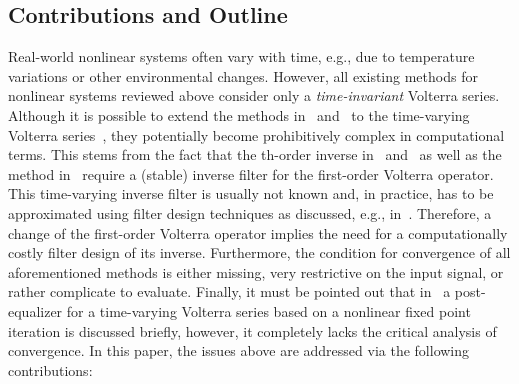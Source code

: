 \documentclass[10pt,twocolumn,twoside]{IEEEtran}
\begin{document}
\subsection{Contributions and Outline}
	\label{intro:contrib}

Real-world nonlinear systems often vary with time, e.g., due to
temperature variations or other environmental changes.
However, all existing methods for nonlinear systems reviewed
above consider only a \emph{time-invariant} Volterra series. Although
it is possible to extend the methods in~\cite{schetzen1976,sarti1992} and~\cite{nowak1997} to
the time-varying Volterra series~\cite{soudan2011}, they potentially become prohibitively complex
in computational terms. This stems from the fact that the th-order inverse in~\cite{schetzen1976}
and~\cite{sarti1992} as well as the method in~\cite{nowak1997} require a (stable) inverse filter
for the first-order Volterra operator. This time-varying inverse filter is usually not known and,
in practice, has to be approximated using filter design techniques as discussed, e.g., in~\cite{vogel2012}.
Therefore, a change of the first-order Volterra operator implies the need for a computationally
costly filter design of its inverse.
Furthermore, the condition for convergence of all aforementioned methods is
either missing, very restrictive on the input signal, or rather complicate to
evaluate. Finally, it must be pointed out that in~\cite{soudan2011} a post-equalizer
for a time-varying Volterra series based on a nonlinear fixed point iteration is
discussed briefly, however, it completely lacks the critical analysis of convergence.
In this paper, the issues above are addressed via the following contributions:
\end{document}
